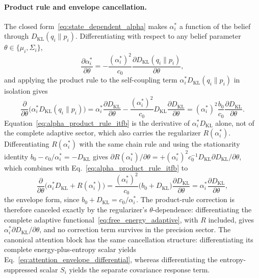 \documentclass[11pt]{article}
\begin{document}
\paragraph{Product rule and envelope cancellation.}
The closed form~\eqref{eq:state_dependent_alpha} makes $\alpha_i^*$ a function of the belief through $D_{\mathrm{KL}}(q_i \| p_i)$. Differentiating with respect to any belief parameter $\theta \in \{\mu_i, \Sigma_i\}$,
\begin{equation}
\frac{\partial \alpha_i^*}{\partial \theta} = -\frac{(\alpha_i^*)^2}{c_0} \frac{\partial D_{\mathrm{KL}}(q_i \| p_i)}{\partial \theta},
\label{eq:alpha_chain_rule_itfb}
\end{equation}
and applying the product rule to the self-coupling term $\alpha_i^* D_{\mathrm{KL}}(q_i \| p_i)$ in isolation gives
\begin{equation}
\frac{\partial}{\partial \theta}\bigl(\alpha_i^* D_{\mathrm{KL}}(q_i \| p_i)\bigr) = \alpha_i^* \frac{\partial D_{\mathrm{KL}}}{\partial \theta} - \frac{(\alpha_i^*)^2}{c_0} D_{\mathrm{KL}} \frac{\partial D_{\mathrm{KL}}}{\partial \theta} = (\alpha_i^*)^2 \frac{b_0}{c_0} \frac{\partial D_{\mathrm{KL}}}{\partial \theta}.
\label{eq:alpha_product_rule_itfb}
\end{equation}
Equation~\eqref{eq:alpha_product_rule_itfb} is the derivative of $\alpha_i^* D_{\mathrm{KL}}$ alone, not of the complete adaptive sector, which also carries the regularizer $R(\alpha_i^*)$. Differentiating $R(\alpha_i^*)$ with the same chain rule and using the stationarity identity $b_0 - c_0/\alpha_i^* = -D_{\mathrm{KL}}$ gives $\partial R(\alpha_i^*)/\partial\theta = +(\alpha_i^*)^2 c_0^{-1} D_{\mathrm{KL}}  \partial D_{\mathrm{KL}}/\partial\theta$, which combines with Eq.~\eqref{eq:alpha_product_rule_itfb} to
\begin{equation}
\frac{\partial}{\partial\theta}\bigl(\alpha_i^* D_{\mathrm{KL}} + R(\alpha_i^*)\bigr) = \frac{(\alpha_i^*)^2}{c_0}\bigl(b_0 + D_{\mathrm{KL}}\bigr)\frac{\partial D_{\mathrm{KL}}}{\partial\theta} = \alpha_i^*\frac{\partial D_{\mathrm{KL}}}{\partial\theta},
\label{eq:alpha_envelope_cancel_itfb}
\end{equation}
the envelope form, since $b_0 + D_{\mathrm{KL}} = c_0/\alpha_i^*$. The product-rule correction is therefore canceled exactly by the regularizer's $\theta$-dependence: differentiating the complete adaptive functional~\eqref{eq:free_energy_adaptive}, with $R$ included, gives $\alpha_i^* \partial D_{\mathrm{KL}}/\partial\theta$, and no correction term survives in the precision sector. The canonical attention block has the same cancellation structure: differentiating its complete energy-plus-entropy scalar yields Eq.~\eqref{eq:attention_envelope_differential}, whereas differentiating the entropy-suppressed scalar $S_i$ yields the separate covariance response term.
\end{document}
